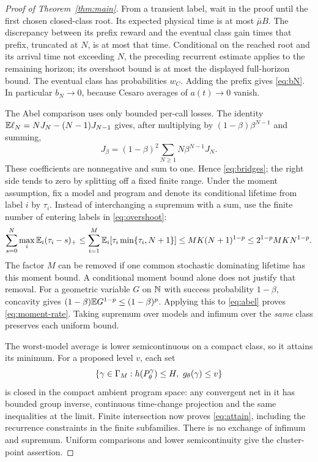 \begin{proof}[Proof of Theorem~\ref{thm:main}]
From a transient label, wait in the proof until the first chosen closed-class root. Its expected physical time is at most $\bar\mu B$. The discrepancy between its prefix reward and the eventual class gain times that prefix, truncated at $N$, is at most that time. Conditional on the reached root and its arrival time not exceeding $N$, the preceding recurrent estimate applies to the remaining horizon; its overshoot bound is at most the displayed full-horizon bound. The eventual class has probabilities $w_C$. Adding the prefix gives \eqref{eq:bN}. In particular $b_N\to0$, because Cesaro averages of $a(t)\to0$ vanish.

The Abel comparison uses only bounded per-call losses. The identity
$\mathbb E\ell_N=NJ_N-(N-1)J_{N-1}$ gives, after multiplying by $(1-\beta)\beta^{N-1}$ and summing,
\begin{equation}\label{eq:abel}
 J_\beta=(1-\beta)^2\sum_{N\ge1}N\beta^{N-1}J_N.
\end{equation}
These coefficients are nonnegative and sum to one. Hence \eqref{eq:bridges}; the right side tends to zero by splitting off a fixed finite range. Under the moment assumption, fix a model and program and denote its conditional lifetime from label $i$ by $\tau_i$. Instead of interchanging a supremum with a sum, use the finite number of entering labels in \eqref{eq:overshoot}:
\[
 \sum_{s=0}^N\max_i\mathbb E_i(\tau_i-s)_+
 \le\sum_{i=1}^M\mathbb E_i[\tau_i\min\{\tau_i,N+1\}]
 \le MK(N+1)^{1-p}\le2^{1-p}MKN^{1-p}.
\]
The factor $M$ can be removed if one common stochastic dominating lifetime has this moment bound. A conditional moment bound alone does not justify that removal.
For a geometric variable $G$ on $\mathbb N$ with success probability $1-\beta$, concavity gives
$(1-\beta)\mathbb E G^{1-p}\le(1-\beta)^p$. Applying this to \eqref{eq:abel} proves \eqref{eq:moment-rate}. Taking supremum over models and infimum over the \emph{same} class preserves each uniform bound.

The worst-model average is lower semicontinuous on a compact class, so it attains its minimum. For a proposed level $v$, each set
\[
 \{\gamma\in\Gamma_M:h(P_\theta^\gamma)\le H,
                         \ g_\theta(\gamma)\le v\}
\]
is closed in the compact ambient program space: any convergent net in it has bounded group inverse, continuous time-change projection and the same inequalities at the limit. Finite intersection now proves \eqref{eq:attain}, including the recurrence constraints in the finite subfamilies. There is no exchange of infimum and supremum. Uniform comparisons and lower semicontinuity give the cluster-point assertion.


\end{proof}
